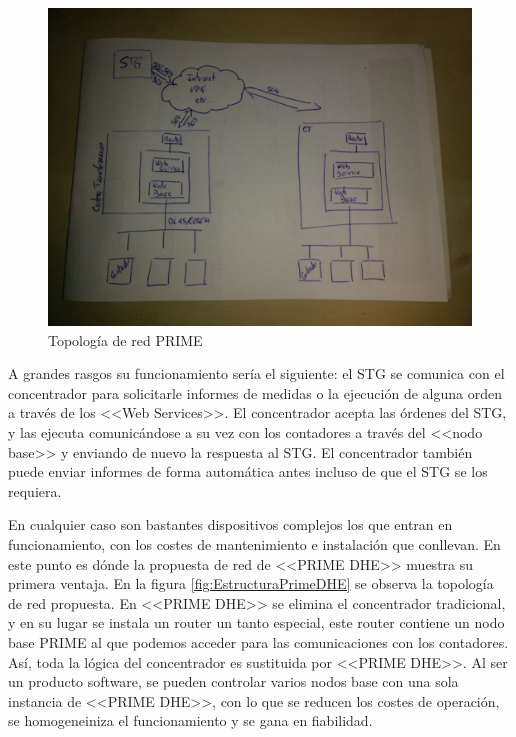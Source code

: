 \begin{figure}[htbp]
	\centering
	\includegraphics[width=\textwidth]{Img/boceto_estructura_prime.jpg}
	\caption{Topología de red PRIME}
	\label{fig:EstructuraPRIME}
\end{figure}

A grandes rasgos su funcionamiento sería el siguiente: el STG se comunica con el concentrador para solicitarle informes de medidas o la ejecución de alguna orden a través de los <<Web Services>>. El concentrador acepta las órdenes del STG, y las ejecuta comunicándose a su vez con los contadores a través del <<nodo base>> y enviando de nuevo la respuesta al STG. El concentrador también puede enviar informes de forma automática antes incluso de que el STG se los requiera.

En cualquier caso son bastantes dispositivos complejos los que entran en funcionamiento, con los costes de mantenimiento e instalación que conllevan. En este punto es dónde la propuesta de red de <<PRIME DHE>> muestra su primera ventaja. En la figura \ref{fig:EstructuraPrimeDHE} se observa la topología de red propuesta. En <<PRIME DHE>> se elimina el concentrador tradicional, y en su lugar se instala un router un tanto especial, este router contiene un nodo base PRIME al que podemos acceder para las comunicaciones con los contadores. Así, toda la lógica del concentrador es sustituida por <<PRIME DHE>>. Al ser un producto software, se pueden controlar varios nodos base con una sola instancia de <<PRIME DHE>>, con lo que se reducen los costes de operación, se homogeneiniza el funcionamiento y se gana en fiabilidad.

